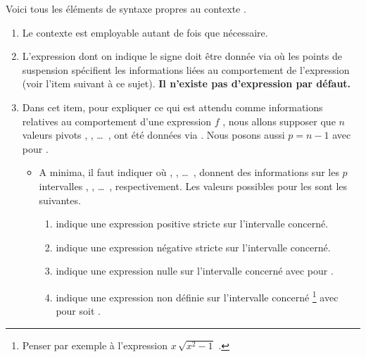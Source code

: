 \documentclass[10pt, a4paper]{article}
\begin{document}
Voici tous les éléments de syntaxe propres au contexte .
%
\begin{enumerate}
    \item Le contexte  est employable autant de fois que nécessaire.


    \item L'expression dont on indique le signe doit être donnée via  où les points de suspension spécifient les informations liées au comportement de l'expression (voir l'item suivant à ce sujet).
    \textbf{Il n'existe pas d'expression par défaut.}


    \item Dans cet item, pour expliquer ce qui est attendu comme informations relatives au comportement d'une expression $f$ , nous allons supposer que $n$ valeurs pivots  ,  , \dots\ ,  ont été données via  . Nous posons aussi $p = n - 1$ avec  pour  .
    \begin{itemize}
        \item A minima, il faut indiquer
        où
         ,  , \dots\ , 
        donnent des informations sur les $p$ intervalles
        \tdoclatexin{]x_1 ; x_2[} , \tdoclatexin{]x_2 ; x_3[} , \dots\ , \tdoclatexin{]x_p ; x_n[} respectivement.
        Les valeurs possibles pour les  sont les suivantes.
        \begin{enumerate}
            \item \tdoclatexin{+} indique une expression positive stricte sur l'intervalle concerné.

            \item \tdoclatexin{-} indique une expression négative stricte sur l'intervalle concerné.

            \item {} indique une expression nulle sur l'intervalle concerné avec  pour .

            \item {} indique une expression non définie sur l'intervalle concerné
            \footnote{
                Penser par exemple à l'expression $x \, \sqrt{x^2 - 1}$ .
            }
            avec  pour  soit .
        \end{enumerate}



\end{itemize}
\end{enumerate}
\end{document}
